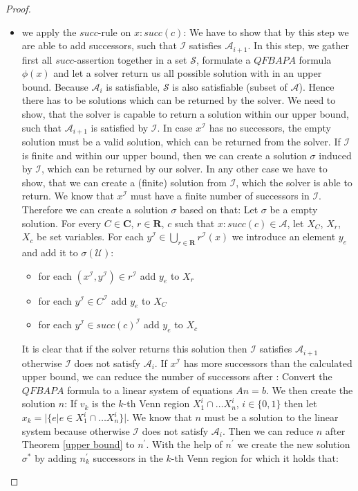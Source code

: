 \documentclass{book}
\theoremstyle{break}
\theoremstyle{definition}
\begin{document}
\begin{proof}
\begin{itemize}
\item we apply the $succ$-rule on $x:succ(c)$: We have to show that by this step we are able to add successors, such that $\mathcal{I}$ satisfies $\mathcal{A}_{i+1}$. In this step, we gather first all $succ$-assertion together in a set $\mathcal{S}$, formulate a $QFBAPA$ formula $\phi(x)$ and let a solver return us all possible solution with in an upper bound. Because $\mathcal{A}_i$ is satisfiable, $\mathcal{S}$ is also satisfiable (subset of $\mathcal{A}$). Hence there has to be solutions which can be returned by the solver. We need to show, that the solver is capable to return a solution within our upper bound, such that $\mathcal{A}_{i+1}$ is satisfied by $\mathcal{I}$. In case $x^\mathcal{I}$ has no successors, the empty solution must be a valid solution, which can be returned from the solver. If $\mathcal{I}$ is finite and within our upper bound, then we can create a solution $\sigma$ induced by $\mathcal{I}$, which can be returned by our solver. In any other case we have to show, that we can create a (finite) solution from $\mathcal{I}$, which the solver is able to return. We know that $x^\mathcal{I}$ must have a finite number of successors in $\mathcal{I}$. Therefore we can create a solution $\sigma$ based on that: Let $\sigma$ be a empty solution. For every $C\in\mathbf{C}$, $r\in\mathbf{R}$, $c$ such that $x:succ(c)\in\mathcal{A}$, let $X_C$, $X_r$, $X_c$ be set variables. For each $y^\mathcal{I}\in \bigcup_{r\in\mathbf{R}}r^\mathcal{I}(x)$ we introduce an element $y_e$ and add it to $\sigma(\mathcal{U})$:
\begin{itemize}
\item for each $(x^\mathcal{I},y^\mathcal{I})\in r^\mathcal{I}$ add $y_e$ to $X_r$
\item for each $y^\mathcal{I}\in C^\mathcal{I}$ add $y_e$ to $X_C$
\item for each $y^\mathcal{I}\in succ(c)^\mathcal{I}$ add $y_e$ to $X_c$
\end{itemize}
It is clear that if the solver returns this solution then $\mathcal{I}$ satisfies $\mathcal{A}_{i+1}$ otherwise $\mathcal{I}$ does not satisfy $\mathcal{A}_i$. If $x^\mathcal{I}$ has more successors than the calculated upper bound, we can reduce the number of successors after \cite{knapsack}: Convert the $QFBAPA$ formula to a linear system of equations $An=b$. We then create the solution $n$: If $v_k$ is the $k$-th Venn region $X_1^i\cap\dots X_n^i$, $i\in\{0,1\}$ then let $x_k=|\{e|e\in X_1^i\cap\dots X_n^i\}|$. We know that $n$ must be a solution to the linear system because otherwise $\mathcal{I}$ does not satisfy $\mathcal{A}_i$. Then we can reduce $n$ after Theorem \ref{upper bound} to $n^\prime$. With the help of $n^\prime$ we create the new solution $\sigma^\ast$ by adding $n^\prime_k$ successors in the $k$-th Venn region for which it holds that:

\end{itemize}
\end{proof}
\end{document}
